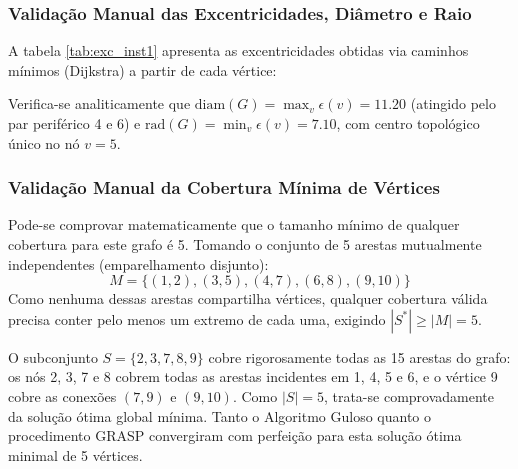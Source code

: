 \documentclass[12pt,a4paper]{article}
\begin{document}
\subsubsection*{Validação Manual das Excentricidades, Diâmetro e Raio}
A tabela \ref{tab:exc_inst1} apresenta as excentricidades obtidas via caminhos mínimos (Dijkstra) a partir de cada vértice:
\begin{table}[H]
    \centering
    \caption{Excentricidades Calculadas para a Instância 1}
    \label{tab:exc_inst1}
\end{table}
Verifica-se analiticamente que $\text{diam}(G) = \max_v \epsilon(v) = 11.20$ (atingido pelo par periférico 4 e 6) e $\text{rad}(G) = \min_v \epsilon(v) = 7.10$, com centro topológico único no nó $v = 5$.

\subsubsection*{Validação Manual da Cobertura Mínima de Vértices}
Pode-se comprovar matematicamente que o tamanho mínimo de qualquer cobertura para este grafo é 5. Tomando o conjunto de 5 arestas mutualmente independentes (emparelhamento disjunto):
\begin{equation}
    M = \{(1, 2), (3, 5), (4, 7), (6, 8), (9, 10)\}
\end{equation}
Como nenhuma dessas arestas compartilha vértices, qualquer cobertura válida precisa conter pelo menos um extremo de cada uma, exigindo $|S^*| \ge |M| = 5$.

O subconjunto $S = \{2, 3, 7, 8, 9\}$ cobre rigorosamente todas as 15 arestas do grafo:
os nós 2, 3, 7 e 8 cobrem todas as arestas incidentes em 1, 4, 5 e 6, e o vértice 9 cobre as conexões $(7, 9)$ e $(9, 10)$. Como $|S| = 5$, trata-se comprovadamente da solução ótima global mínima. Tanto o Algoritmo Guloso quanto o procedimento GRASP convergiram com perfeição para esta solução ótima minimal de 5 vértices.
\end{document}
